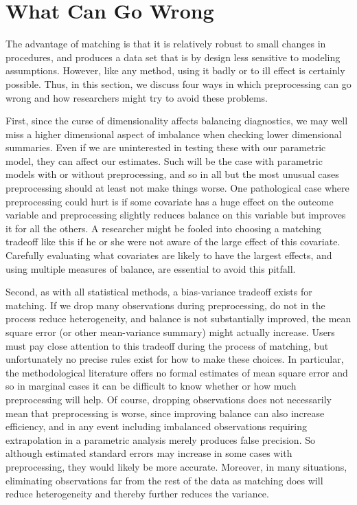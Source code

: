 \documentclass[11pt,titlepage]{article}
\begin{document}
\section{What Can Go Wrong}

The advantage of matching is that it is relatively robust to small
changes in procedures, and produces a data set that is by design less
sensitive to modeling assumptions.  However, like any method, using it
badly or to ill effect is certainly possible.  Thus, in this section,
we discuss four ways in which preprocessing can go wrong and how
researchers might try to avoid these problems.

First, since the curse of dimensionality affects balancing
diagnostics, we may well miss a higher dimensional aspect of imbalance
when checking lower dimensional summaries.  Even if we are
uninterested in testing these with our parametric model, they can
affect our estimates.  Such will be the case with parametric models
with or without preprocessing, and so in all but the most unusual
cases preprocessing should at least not make things worse.  One
pathological case where preprocessing could hurt is if some covariate
has a huge effect on the outcome variable and preprocessing slightly
reduces balance on this variable but improves it for all the others.
A researcher might be fooled into choosing a matching tradeoff like
this if he or she were not aware of the large effect of this
covariate.  Carefully evaluating what covariates are likely to have
the largest effects, and using multiple measures of balance, are
essential to avoid this pitfall.

Second, as with all statistical methods, a bias-variance tradeoff
exists for matching.  If we drop many observations during
preprocessing, do not in the process reduce heterogeneity, and balance
is not substantially improved, the mean square error (or other
mean-variance summary) might actually increase.  Users must pay close
attention to this tradeoff during the process of matching, but
unfortunately no precise rules exist for how to make these choices.
In particular, the methodological literature offers no formal
estimates of mean square error and so in marginal cases it can be
difficult to know whether or how much preprocessing will help.  Of
course, dropping observations does not necessarily mean that
preprocessing is worse, since improving balance can also increase
efficiency, and in any event including imbalanced observations
requiring extrapolation in a parametric analysis merely produces false
precision.  So although estimated standard errors may increase in some
cases with preprocessing, they would likely be more accurate.
Moreover, in many situations, eliminating observations far from the
rest of the data as matching does will reduce heterogeneity and
thereby further reduces the variance.
\end{document}

